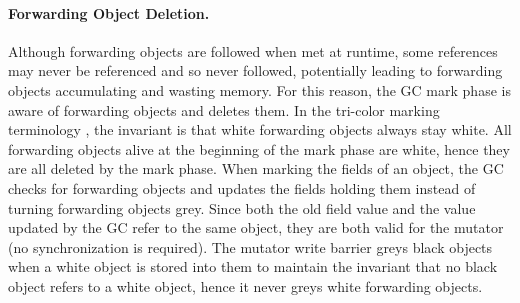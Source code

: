 \documentclass[sigplan,10pt,review,anonymous]{acmart}\settopmatter{printfolios=true,printccs=false,printacmref=false}
\newcommand{\egb}[1]{\color{blue}\fbox{\bfseries\sffamily\scriptsize Elisa:}{\sf\small$\blacktriangleright$\textit{#1}$\blacktriangleleft$}\color{black}}
\newcommand{\eem}[1]{\color{olive}\fbox{\bfseries\sffamily\scriptsize Eliot:}{\sf\small$\blacktriangleright$\textit{#1}$\blacktriangleleft$}\color{black}}
\begin{document}


\paragraph{Forwarding Object Deletion.}

Although forwarding objects are followed when met at runtime, some references may never be referenced and so never followed, potentially leading to forwarding objects accumulating and wasting memory. For this reason, the GC mark phase is aware of forwarding objects and deletes them. In the tri-color marking terminology \cite{firstTriColorGC}, the invariant is that white forwarding objects always stay white. All forwarding objects alive at the beginning of the mark phase are white, hence they are all deleted by the mark phase. When marking the fields of an object, the GC checks for forwarding objects and updates the fields holding them instead of turning forwarding objects grey. Since both the old field value and the value updated by the GC refer to the same object, they are both valid for the mutator (no synchronization is required). The mutator write barrier greys black objects when a white object is stored into them to maintain the invariant that no black object refers to a white object, hence it never greys white forwarding objects.
\end{document}
